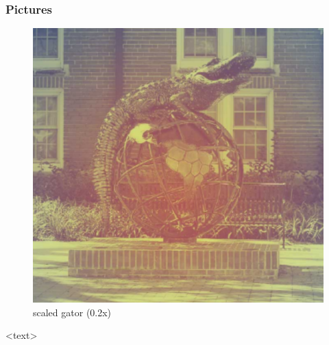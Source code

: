 \documentclass{beamer}
\begin{document}
\begin{frame}
\frametitle{Pictures}
\begin{figure}
\includegraphics[scale=0.2]{gator.png}
\caption{scaled gator (0.2x)}
\end{figure}
<text>
\end{frame}
\end{document}
